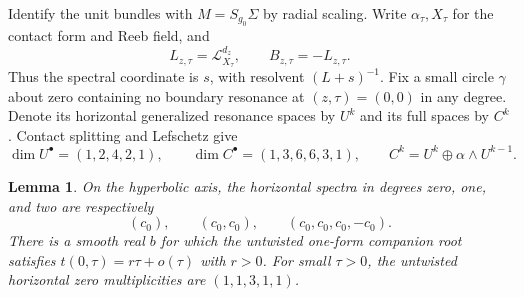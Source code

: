 \documentclass[11pt]{article}
\newtheorem{lemma}[theorem]{Lemma}
\newcommand{\LL}{\mathcal L}
\begin{document}
Identify the unit bundles with $M=S_{g_0}\Sigma$ by radial scaling.
Write $\alpha_\tau,X_\tau$ for the contact form and Reeb field, and
\[
 L_{z,\tau}=\LL^{d_z}_{X_\tau},\qquad B_{z,\tau}=-L_{z,\tau}.
\]
Thus the spectral coordinate is $s$, with resolvent $(L+s)^{-1}$.
Fix a small circle $\gamma$ about zero containing no boundary resonance
at $(z,\tau)=(0,0)$ in any degree. Denote its horizontal generalized
resonance spaces by $U^k$ and its full spaces by $C^k$. Contact splitting
and Lefschetz give
\begin{equation}\label{ranks}
 \dim U^\bullet=(1,2,4,2,1),\qquad
 \dim C^\bullet=(1,3,6,6,3,1),\qquad
 C^k=U^k\oplus\alpha\wedge U^{k-1}.
\end{equation}

\begin{lemma}\label{axes}
On the hyperbolic axis, the horizontal spectra in degrees zero, one,
and two are respectively
\begin{equation}\label{hyper}
 (c_0),\qquad(c_0,c_0),\qquad(c_0,c_0,c_0,-c_0).
\end{equation}
There is a smooth real $b$ for which the untwisted one-form companion
root satisfies $t(0,\tau)=r\tau+o(\tau)$ with $r>0$. For small
$\tau>0$, the untwisted horizontal zero multiplicities are $(1,1,3,1,1)$.
\end{lemma}
\end{document}
